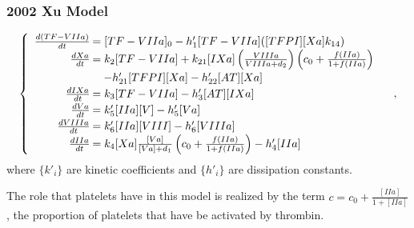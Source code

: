 \begin{frame}
\frametitle{2002 Xu Model}\vspace{-1.5em}
$$\begin{cases}\begin{array}{rl}
\frac{d(TF-VIIa)}{dt}\hspace{-.8em}&=[TF-VIIa]_0-h'_1[TF-VIIa]([TFPI][Xa]k_{14})\\
\frac{dXa}{dt}\hspace{-.8em}&=k_2[TF-VIIa]+k_{21}[IXa]\left(\frac{VIIIa}{VIIIa+d_2}\right)\left(c_0+\frac{f(IIa)}{1+f(IIa)}\right)\\&\hspace{1em}-h'_{21}[TFPI][Xa]-h'_{22}[AT][Xa]\\
\frac{dIXa}{dt}\hspace{-.8em}&=k_3[TF-VIIa]-h'_3[AT][IXa]\\
\frac{dVa}{dt}\hspace{-.8em}&=k'_5[IIa][V]-h'_5[Va]\\
\frac{dVIIIa}{dt}\hspace{-.8em}&=k'_6[IIa][VIII]-h'_6[VIIIa]\\
\frac{dIIa}{dt}\hspace{-.8em}&=k_4[Xa]\frac{[Va]}{[Va]+d_1}\left(c_0+\frac{f(IIa)}{1+f(IIa)}\right)-h'_4[IIa]
\end{array}\end{cases},$$ where $\{k'_i\}$ are kinetic coefficients and $\{h'_i\}$ are dissipation constants.

\hspace{1.57em}The role that platelets have in this model is realized by the term $c=c_0+\frac{[IIa]}{1+[IIa]}$, the proportion of platelets that have be activated by thrombin.%
\end{frame}
